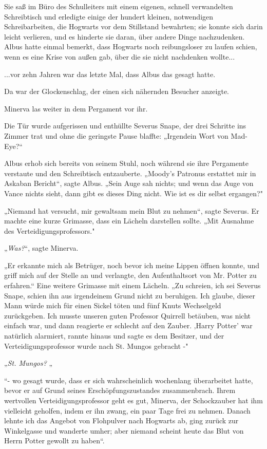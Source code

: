 {Sie saß im Büro des Schulleiters mit einem eigenen, schnell verwandelten Schreibtisch und erledigte einige der hundert kleinen, notwendigen Schreibarbeiten, die Hogwarts vor dem Stillstand bewahrten; sie konnte sich darin leicht verlieren, und es hinderte sie daran, über andere Dinge nachzudenken. Albus hatte einmal bemerkt, dass Hogwarts noch reibungsloser zu laufen schien, wenn es eine Krise von außen gab, über die sie nicht nachdenken wollte...

...vor zehn Jahren war das letzte Mal, dass Albus das gesagt hatte.

Da war der Glockenschlag, der einen sich nähernden Besucher anzeigte.

Minerva las weiter in dem Pergament vor ihr.

Die Tür wurde aufgerissen und enthüllte Severus Snape, der drei Schritte ins Zimmer trat und ohne die geringste Pause blaffte: „Irgendein Wort von Mad-Eye?“

Albus erhob sich bereits von seinem Stuhl, noch während sie ihre Pergamente verstaute und den Schreibtisch entzauberte. „Moody's Patronus erstattet mir in Askaban Bericht“, sagte Albus. „Sein Auge sah nichts; und wenn das Auge von Vance nichts sieht, dann gibt es dieses Ding nicht. Wie ist es dir selbst ergangen?"

„Niemand hat versucht, mir gewaltsam mein Blut zu nehmen“, sagte Severus. Er machte eine kurze Grimasse, dass ein Lächeln darstellen sollte. „Mit Ausnahme des Verteidigungsprofessors."

„\emph{Was?}“, sagte Minerva.

„Er erkannte mich als Betrüger, noch bevor ich meine Lippen öffnen konnte, und griff mich auf der Stelle an und verlangte, den Aufenthaltsort von Mr. Potter zu erfahren.“ Eine weitere Grimasse mit einem Lächeln. „Zu schreien, ich sei Severus Snape, schien ihn aus irgendeinem Grund nicht zu beruhigen. Ich glaube, dieser Mann würde mich für einen Sickel töten und fünf Knuts Wechselgeld zurückgeben. Ich musste unseren guten Professor Quirrell betäuben, was nicht einfach war, und dann reagierte er schlecht auf den Zauber. ‚Harry Potter' war natürlich alarmiert, rannte hinaus und sagte es dem Besitzer, und der Verteidigungsprofessor wurde nach St. Mungos gebracht -"

„\emph{St. Mungos?} „

“- wo gesagt wurde, dass er sich wahrscheinlich wochenlang überarbeitet hatte, bevor er auf Grund seines Erschöpfungszustandes zusammenbrach. Ihrem wertvollen Verteidigungsprofessor geht es gut, Minerva, der Schockzauber hat ihm vielleicht geholfen, indem er ihn zwang, ein paar Tage frei zu nehmen. Danach lehnte ich das Angebot von Flohpulver nach Hogwarts ab, ging zurück zur Winkelgasse und wanderte umher; aber niemand scheint heute das Blut von Herrn Potter gewollt zu haben“.

}
